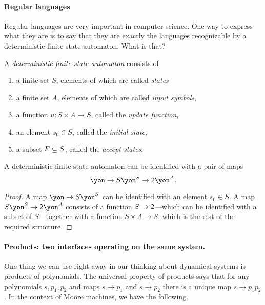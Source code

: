 \documentclass[DynamicalBook]{subfiles}
\begin{document}
\paragraph{Regular languages}

Regular languages are very important in computer science. One way to express what they are is to say that they are exactly the languages recognizable by a deterministic finite state automaton. What is that?

\begin{definition}\label{def.dfa}
A \emph{deterministic finite state automaton} consists of
\begin{enumerate}
	\item a finite set $S$, elements of which are called \emph{states}
	\item a finite set $A$, elements of which are called \emph{input symbols},
	\item a function $u\colon S\times A\to S$, called the \emph{update function},
	\item an element $s_0\in S$, called the \emph{initial state},
	\item a subset $F\ss S$, called the \emph{accept states}.
\end{enumerate}
\end{definition}

\begin{proposition}
A deterministic finite state automaton can be identified with a pair of maps
\[
\yon\to S\yon^S\to \2\yon^A.
\]
\end{proposition}
\begin{proof}
A map $\yon\to S\yon^S$ can be identified with an element $s_0\in S$. A map $S\yon^S\to\2\yon^A$ consists of a function $S\to\2$---which can be identified with a subset of $S$---together with a function $S\times A\to S$, which is the rest of the required structure.
\end{proof}


\paragraph{Products: two interfaces operating on the same system.}

One thing we can use right away in our thinking about dynamical systems is products of polynomials. The universal property of products says that for any polynomials $s,p_1,p_2$ and maps $s\to p_1$ and $s\to p_2$ there is a unique map $s\to p_1p_2$. In the context of Moore machines, we have the following.
\end{document}

